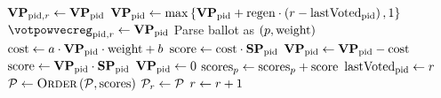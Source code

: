 \begin{algorithm}[H]
  \caption{$\textsc{HandleVote}\left(\mathrm{ballot},
  \player_{\pid}\right)$}
  \label{alg:steem:handlevote}
  \begin{algorithmic}[1]
     
      \State $\mathrm{\textbf{VP}}_{\mathrm{pid}, r} \gets \mathrm{\textbf{VP}}_{\mathrm{pid}}$ 
      \State $\mathrm{\textbf{VP}}_{\mathrm{pid}} \gets \max{\lbrace \mathrm{\textbf{VP}}_{\mathrm{pid}} + \mathrm{regen}\cdot \left(r- \mathrm{lastVoted}_{\mathrm{pid}}\right), 1 \rbrace}$
      \State $\votpowvecreg_{\pid, r} \gets \votpowvec_{\pid}$ 
      \label{alg:steem:handlevote:regen}
        \State Parse ballot as $\left(p, \mathrm{weight}\right)$
        \State $\mathrm{cost} \gets a \cdot \mathrm{\textbf{VP}}_{\mathrm{pid}} \cdot
        \mathrm{weight} + b$
        \label{alg:steem:handlevote:cost:start}
          \State $\mathrm{score} \gets \mathrm{cost} \cdot \mathrm{\textbf{SP}}_{\mathrm{pid}}$
          \State $\mathrm{\textbf{VP}}_{\mathrm{pid}} \gets \mathrm{\textbf{VP}}_{\mathrm{pid}} - \mathrm{cost}$
        \Else
          \State $\mathrm{score} \gets \mathrm{\textbf{VP}}_{\mathrm{pid}} \cdot
          \mathrm{\textbf{SP}}_{\mathrm{pid}}$
          \State $\mathrm{\textbf{VP}}_{\mathrm{pid}} \gets 0$
        \EndIf
        \label{alg:steem:handlevote:cost:end}
        \State $\mathrm{scores}_p \gets \mathrm{scores}_p +
        \mathrm{score}$
      \EndIf
      \State $\mathrm{lastVoted}_{\mathrm{pid}} \gets r$
    \EndIf
      \State $\mathcal{P} \gets \textsc{Order}\left(\mathcal{P},
      \mathrm{scores}\right)$ 
      \label{alg:steem:handlevote:order}
      \State $\mathcal{P}_r \gets \mathcal{P}$ 
      \State $r \gets r + 1$
    \EndIf {}
  \end{algorithmic}
\end{algorithm}
